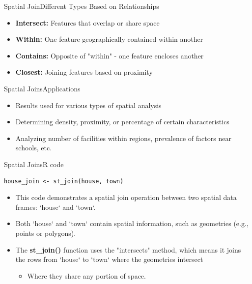 \documentclass[hyperref={pdfpagelabels=false}]{beamer}
\begin{document}
\begin{frame}{Spatial Join}{Different Types Based on Relationships}

	\begin{itemize}
		\item \textbf{Intersect:} Features that overlap or share space
							\vspace{0.2cm}
		\item \textbf{Within:} One feature geographically contained within another
							\vspace{0.2cm}
		\item \textbf{Contains:} Opposite of "within" - one feature encloses another
							\vspace{0.2cm}
		\item \textbf{Closest:} Joining features based on proximity
	\end{itemize}
\end{frame}

\begin{frame}{Spatial Joins}{Applications}
	\begin{itemize}
		\item Results used for various types of spatial analysis
									\vspace{0.2cm}
		\item Determining density, proximity, or percentage of certain characteristics
									\vspace{0.2cm}
		\item Analyzing number of facilities within regions, prevalence of factors near schools, etc.
	\end{itemize}
\end{frame}




\begin{frame}[fragile]{Spatial Joins}{R code}
\begin{lstlisting}
house_join <- st_join(house, town)
\end{lstlisting}
\begin{itemize}
	\item This code demonstrates a spatial join operation between two spatial data frames: `house` and `town`.
	\vspace{0.2cm}
	\item Both `house` and `town` contain spatial information, such as geometries (e.g., points or polygons).
	\vspace{0.2cm}
	\item The \textbf{st\_join()} function uses the "intersects" method, which means it joins the rows from `house` to `town` where the geometries intersect
	\vspace{0.2cm}
	\begin{itemize}
		\item Where they share any portion of space.
	\end{itemize}
\end{itemize}
\end{frame}
\end{document}
